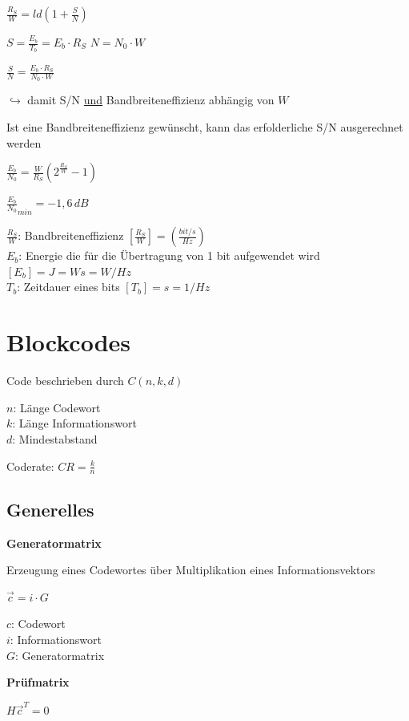 $\displaystyle{
    \frac{R_S}{W} = ld\left( 1 + \frac{S}{N} \right)
}$

$\displaystyle{
    S = \frac{E_b}{T_b} = E_b \cdot R_S
}$\;\;\;\;\;\;\;\;\;\;
$\displaystyle{
    N = N_0 \cdot W
}$

$\displaystyle{
    \frac{S}{N} = \frac{E_b \cdot R_S}{N_0 \cdot W}
}$

$\hookrightarrow$ damit S/N \underline{und} Bandbreiteneffizienz abhängig von $W$

Ist eine Bandbreiteneffizienz gewünscht, kann das erfolderliche S/N ausgerechnet werden

$\displaystyle{
    \frac{E_b}{N_0} = \frac{W}{R_S} \left( 2^{\frac{R_S}{W}} - 1 \right)
}$

$\displaystyle{
    \frac{E_b}{N_0}_{min} = -1,6\,dB
}$

$\frac{R_S}{W}$: Bandbreiteneffizienz $[\frac{R_S}{W}] = \left(\frac{bit/s}{Hz}\right)$\\
$E_b$: Energie die für die Übertragung von 1 bit aufgewendet wird $[E_b] = J = Ws = W/Hz$\\
$T_b$: Zeitdauer eines bits $[T_b] = s = 1/Hz$

\section{Blockcodes}

Code beschrieben durch $C(n, k, d)$

$n$: Länge Codewort\\
$k$: Länge Informationswort\\
$d$: Mindestabstand

Coderate: 
$\displaystyle{
    CR = \frac{k}{n}
}$

\subsection{Generelles}

\textbf{Generatormatrix}

Erzeugung eines Codewortes über Multiplikation eines Informationsvektors

$\displaystyle{
    \vec{c} = i \cdot G
}$

$c$: Codewort\\
$i$: Informationswort\\
$G$: Generatormatrix

\textbf{Prüfmatrix}

$\displaystyle{
    H \vec{c}^T = 0
}$

